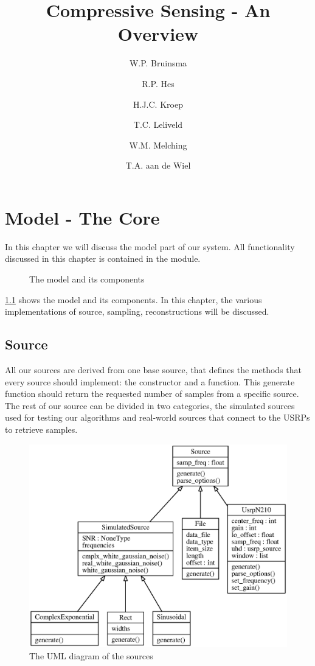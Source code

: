 \documentclass[a4paper, openany, oneside]{memoir}
\title{Compressive Sensing - An Overview}
\author{W.P. Bruinsma \and R.P. Hes \and H.J.C. Kroep \and T.C. Leliveld \and W.M. Melching \and T.A. aan de Wiel}
\begin{document}
\chapter{Model - The Core}
\label{cha:model}
In this chapter we will discuss the model part of our system. All functionality discussed in this chapter is contained in the  module.

\begin{figure}[h]
    \centering
    \begin{adjustbox}{width=\textwidth}
    
    \end{adjustbox}
    \caption{The model and its components}
    \label{fig:model-diagram}
\end{figure}

\cref{fig:model-diagram} shows the model and its components. In this chapter, the various implementations of source, sampling, reconstructions will be discussed.

\section{Source}
\label{sec:source}
All our sources are derived from one base source, that defines the methods that every source should implement: the constructor and a  function. This generate function should return the requested number of samples from a specific source. The rest of our source can be divided in two categories, the simulated sources used for testing our algorithms and real-world sources that connect to the USRPs to retrieve samples.

\begin{figure}
    \centering
    \includegraphics[width=\linewidth]{figures/classes_source.eps}
    \caption{The UML diagram of the sources}
    \label{fig:umlsource}
\end{figure}
\end{document}
